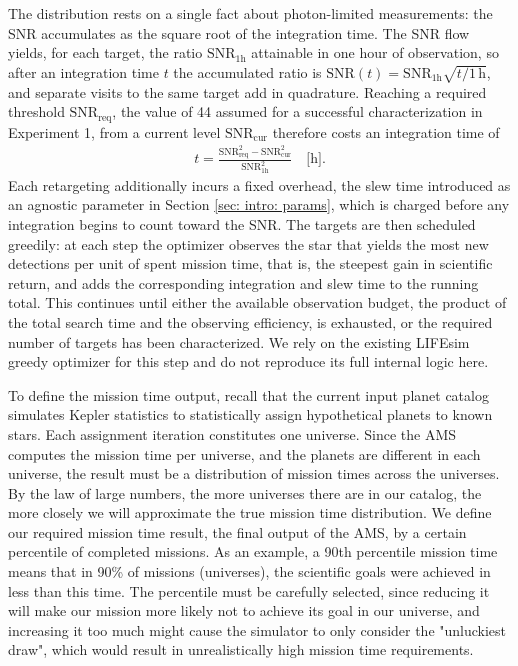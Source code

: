 \documentclass[12pt,a4paper]{article}
\numberwithin{equation}{section}
\numberwithin{figure}{section}
\numberwithin{table}{section}
\begin{document}
The distribution rests on a single fact about photon-limited measurements: the SNR accumulates as the square root of the integration time. The SNR flow yields, for each target, the ratio $\text{SNR}_{1\text{h}}$ attainable in one hour of observation, so after an integration time $t$ the accumulated ratio is $\text{SNR}(t) = \text{SNR}_{1\text{h}}\sqrt{t/1\,\text{h}}$, and separate visits to the same target add in quadrature. Reaching a required threshold $\text{SNR}_\text{req}$, the value of 44 assumed for a successful characterization in Experiment 1, from a current level $\text{SNR}_\text{cur}$ therefore costs an integration time of
\begin{align} \label{eq: integration time}
    t = \frac{\text{SNR}_\text{req}^2 - \text{SNR}_\text{cur}^2}{\text{SNR}_{1\text{h}}^2}\quad\text{[h]}.
\end{align}
Each retargeting additionally incurs a fixed overhead, the slew time introduced as an agnostic parameter in Section \ref{sec: intro: params}, which is charged before any integration begins to count toward the SNR. The targets are then scheduled greedily: at each step the optimizer observes the star that yields the most new detections per unit of spent mission time, that is, the steepest gain in scientific return, and adds the corresponding integration and slew time to the running total. This continues until either the available observation budget, the product of the total search time and the observing efficiency, is exhausted, or the required number of targets has been characterized. We rely on the existing LIFEsim greedy optimizer for this step and do not reproduce its full internal logic here.

To define the mission time output, recall that the current input planet catalog simulates Kepler statistics to statistically assign hypothetical planets to known stars. Each assignment iteration constitutes one universe. Since the AMS computes the mission time per universe, and the planets are different in each universe, the result must be a distribution of mission times across the universes. By the law of large numbers, the more universes there are in our catalog, the more closely we will approximate the true mission time distribution.  We define our required mission time result, the final output of the AMS, by a certain percentile of completed missions. As an example, a 90th percentile mission time means that in 90\% of missions (universes), the scientific goals were achieved in less than this time. The percentile must be carefully selected, since reducing it will make our mission more likely not to achieve its goal in our universe, and increasing it too much might cause the simulator to only consider the "unluckiest draw", which would result in unrealistically high mission time requirements.
\end{document}
